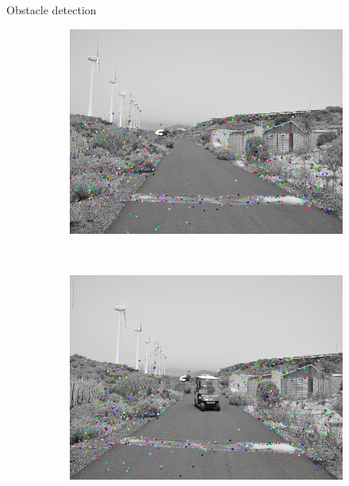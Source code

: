 \begin{frame}{Obstacle detection}
\begin{figure}[t]
\begin{subfigure}[b]{0.24\columnwidth}
	    \includegraphics[width=\textwidth]{pipeline2/fig2}\label{fig:pipelineB_1}
	\end{subfigure}%
	~
	\begin{subfigure}[b]{0.24\columnwidth}
	    \includegraphics[width=\textwidth]{pipeline2/fig1}\label{fig:pipelineB_2}
	\end{subfigure}%
	~
	\begin{subfigure}[b]{0.24\columnwidth}

\end{subfigure}
\end{figure}
\end{frame}
